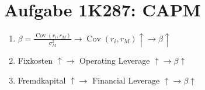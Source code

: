 \documentclass{article}
\DeclareMathOperator{\Cov}{Cov}
\begin{document}
	\section*{Aufgabe 1K287: CAPM}
	\begin{enumerate}[label=(\alph*)]
		\item $\beta = \frac{\Cov(r_i,r_M)}{\sigma_M^2} \to \Cov(r_i,r_M) \uparrow \to \beta \uparrow$
		\item Fixkosten $\uparrow\to$ Operating Leverage $\uparrow \to \beta\uparrow$
		\item Fremdkapital $\uparrow\to$ Financial Leverage $\uparrow\to\beta \uparrow$
	\end{enumerate}
	
\end{document}
